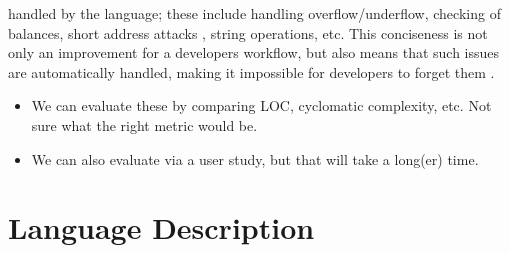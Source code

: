 \documentclass[sigconf]{acmart}
\begin{document}
handled by the language; these include handling overflow/underflow, checking of balances, short address attacks , string operations, etc.
This conciseness is not only an improvement for a developers workflow, but also means that such issues are automatically handled, making it impossible for developers to forget them .
\begin{itemize}
    \item We can evaluate these by comparing LOC, cyclomatic complexity, etc.
        Not sure what the right metric would be.

    \item We can also evaluate via a user study, but that will take a long(er) time.
\end{itemize}

\section{Language Description}
\end{document}
